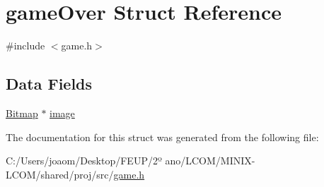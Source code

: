 \hypertarget{structgame_over}{}\section{game\+Over Struct Reference}
\label{structgame_over}


{\ttfamily \#include $<$game.\+h$>$}

\subsection*{Data Fields}
\begin{DoxyCompactItemize}
\item 
\mbox{\hyperlink{struct_bitmap}{Bitmap}} $\ast$ \mbox{\hyperlink{group__game_ga801bef0ab9d72c95bc5d6d6a0d8f2db0}{image}}
\end{DoxyCompactItemize}


The documentation for this struct was generated from the following file\+:\begin{DoxyCompactItemize}
\item 
C\+:/\+Users/joaom/\+Desktop/\+F\+E\+U\+P/2º ano/\+L\+C\+O\+M/\+M\+I\+N\+I\+X-\/\+L\+C\+O\+M/shared/proj/src/\mbox{\hyperlink{game_8h}{game.\+h}}\end{DoxyCompactItemize}
